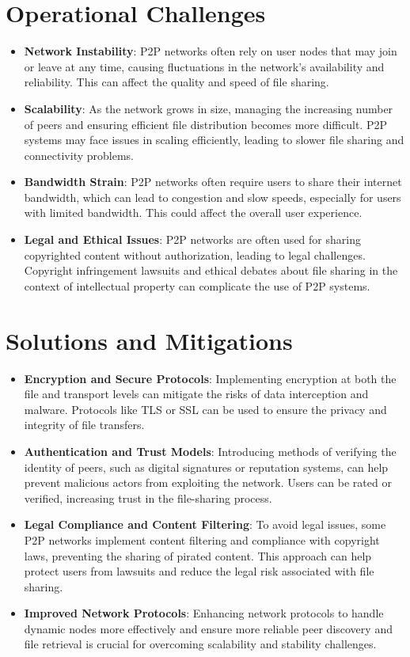 \documentclass{article}
\begin{document}
\section{Operational Challenges}

\begin{itemize}
    \item \textbf{Network Instability}: P2P networks often rely on user nodes that may join or leave at any time, causing fluctuations in the network’s availability and reliability. This can affect the quality and speed of file sharing.
    \item \textbf{Scalability}: As the network grows in size, managing the increasing number of peers and ensuring efficient file distribution becomes more difficult. P2P systems may face issues in scaling efficiently, leading to slower file sharing and connectivity problems.
    \item \textbf{Bandwidth Strain}: P2P networks often require users to share their internet bandwidth, which can lead to congestion and slow speeds, especially for users with limited bandwidth. This could affect the overall user experience.
    \item \textbf{Legal and Ethical Issues}: P2P networks are often used for sharing copyrighted content without authorization, leading to legal challenges. Copyright infringement lawsuits and ethical debates about file sharing in the context of intellectual property can complicate the use of P2P systems.
\end{itemize}

\section{Solutions and Mitigations}
\begin{itemize}
    \item \textbf{Encryption and Secure Protocols}: Implementing encryption at both the file and transport levels can mitigate the risks of data interception and malware. Protocols like TLS or SSL can be used to ensure the privacy and integrity of file transfers.
    \item \textbf{Authentication and Trust Models}: Introducing methods of verifying the identity of peers, such as digital signatures or reputation systems, can help prevent malicious actors from exploiting the network. Users can be rated or verified, increasing trust in the file-sharing process.
    \item \textbf{Legal Compliance and Content Filtering}: To avoid legal issues, some P2P networks implement content filtering and compliance with copyright laws, preventing the sharing of pirated content. This approach can help protect users from lawsuits and reduce the legal risk associated with file sharing.
    \item \textbf{Improved Network Protocols}: Enhancing network protocols to handle dynamic nodes more effectively and ensure more reliable peer discovery and file retrieval is crucial for overcoming scalability and stability challenges.
\end{itemize}
\end{document}
